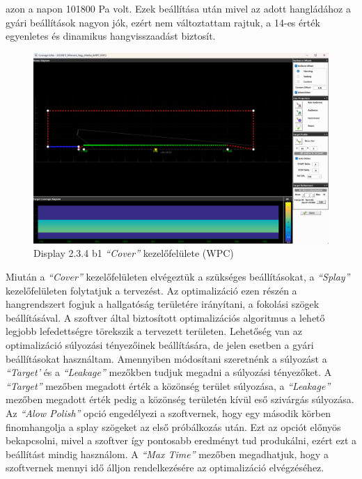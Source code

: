 azon a napon 101800 Pa volt. Ezek beállítása után mivel az adott hangládához a gyári beállítások nagyon jók, ezért nem változtattam rajtuk,
a 14-es érték egyenletes és dinamikus hangvisszaadást biztosít.
\begin{figure}[H]
	\centering
	\includegraphics[width=\textwidth, keepaspectratio]{figures/display_wpc_2.png}
	\caption{Display 2.3.4 b1 \textit{``Cover''} kezelőfelülete (WPC)}\label{fig:display_wpc_2}
\end{figure}
Miután a \textit{``Cover''} kezelőfelületen elvégeztük a szükséges beállításokat, a \textit{``Splay''} kezelőfelületen folytatjuk a tervezést.
Az optimalizáció ezen részén a hangrendszert fogjuk a hallgatóság területére irányítani, a fokolási szögek beállításával.
A szoftver által biztosított optimalizációs algoritmus a lehető legjobb lefedettségre törekszik a tervezett területen.
Lehetőség van az optimalizáció súlyozási tényezőinek beállítására, de jelen esetben a gyári beállításokat használtam.
Amennyiben módosítani szeretnénk a súlyozást a \textit{``Target'} és a \textit{``Leakage''} mezőkben tudjuk megadni a súlyozási tényezőket.
A \textit{``Target''} mezőben megadott érték a közönség terület súlyozása,
a \textit{``Leakage''} mezőben megadott érték pedig a közönség területén kívül eső szivárgás súlyozása.
Az \textit{``Alow Polish''} opció engedélyezi a szoftvernek, hogy egy második körben finomhangolja a splay szögeket az első próbálkozás után.
Ezt az opciót előnyös bekapcsolni, mivel a szoftver így pontosabb eredményt tud produkálni, ezért ezt a beállítást mindig használom.
A \textit{``Max Time''} mezőben megadhatjuk, hogy a szoftvernek mennyi idő álljon rendelkezésére az optimalizáció elvégzéséhez.
